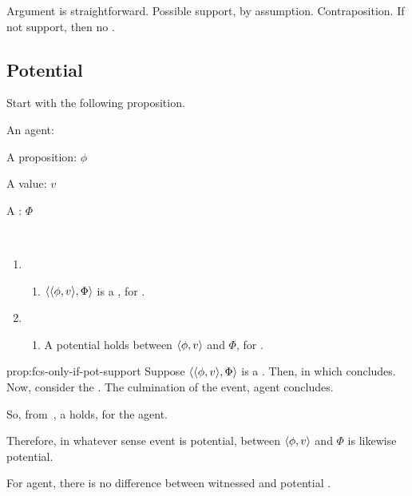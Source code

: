 \begin{note}[Argument]
  Argument is straightforward.
  Possible support, by assumption.
  Contraposition.
  If not support, then no \fc{}.
\end{note}

\subsection{Potential }

\begin{note}
  Start with the following proposition.
  \begin{proposition}
    \label{prop:fcs-only-if-pot-support}
    \begin{itemize*}[noitemsep, label=\(\circ\)]
    \item
      An agent: \vAgent{}
    \item
      A proposition: \(\phi\)
    \item
      A value: \(v\)
    \item
      A : \(\Phi\)
    \item
      \mbox{ }
    \end{itemize*}

    \begin{enumerate}
    \item[\emph{If}:]
      \begin{enumerate}[label=\alph*., ref=(\alph*.)]
      \item
        \(\langle \langle \phi, v \rangle, \Phi \rangle\) is a , for \vAgent{}.
      \end{enumerate}
    \item[\emph{then}:]
      \begin{enumerate}[label=\alph*., ref=(\alph*.), resume]
      \item
        A potential \ros{} holds between \(\langle \phi, v \rangle\) and \(\Phi\), for \vAgent{}.
      \end{enumerate}
    \end{enumerate}
    \vspace{-\baselineskip}
  \end{proposition}

  \begin{argument}{prop:fcs-only-if-pot-support}
    Suppose \(\langle \langle \phi, v \rangle, \Phi \rangle\) is a .
    Then, \pevent{} in which concludes.
    Now, consider the \pevent{}.
    The culmination of the event, agent concludes.

    So, from~\supportI{}, a \ros{} holds, for the agent.

    Therefore, in whatever sense event is potential, \ros{} between \(\langle \phi, v \rangle\) and \(\Phi\) is likewise potential.
  \end{argument}

  For agent, there is no difference between witnessed \ros{} and potential \ros{}.
\end{note}


